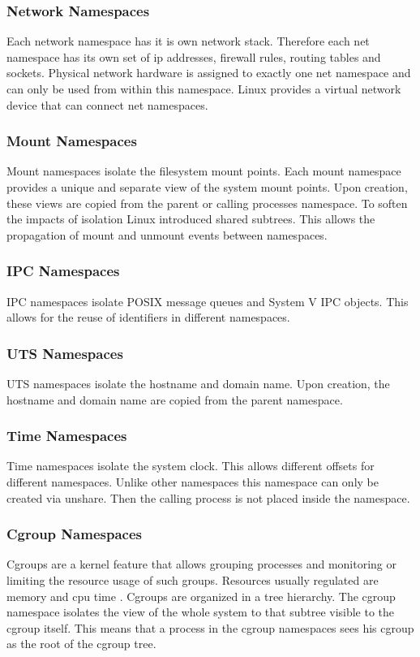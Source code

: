 \documentclass[10pt,twocolumn,a4paper]{article}
\begin{document}
\subsubsection{Network Namespaces}
Each network namespace has it is own network stack. Therefore each net namespace has its own set of ip
addresses, firewall rules, routing tables and sockets. Physical network hardware is assigned to exactly one
net namespace and can only be used from within this namespace. Linux provides a virtual network
 device that can connect net namespaces.\cite{10}

\subsubsection{Mount Namespaces}
Mount namespaces isolate the filesystem mount points. 
Each mount namespace provides a unique and separate view of the system mount points. 
Upon creation, these views are copied from the parent or calling processes namespace.
To soften the impacts of isolation Linux introduced shared subtrees. This allows the propagation of
mount and unmount events between namespaces.\cite{12}

\subsubsection{IPC Namespaces}
IPC namespaces isolate POSIX message queues and System V IPC objects. This allows for the reuse of identifiers
in different namespaces.\cite{13}

\subsubsection{UTS Namespaces}
UTS namespaces isolate the hostname and domain name. Upon creation, the hostname and domain name are copied from the parent namespace.\cite{14}

\subsubsection{Time Namespaces}
Time namespaces isolate the system clock. This allows different offsets for different namespaces.
Unlike other namespaces this namespace can only be created via unshare. 
Then the calling process is not placed inside the namespace.\cite{15}

\subsubsection{Cgroup Namespaces}
Cgroups are a kernel feature that allows grouping processes and monitoring or limiting the resource usage
of such groups.
Resources usually regulated are memory and cpu time \cite{16}.
Cgroups are organized in a tree hierarchy. 
The cgroup namespace isolates the view of the whole system to that subtree visible to the cgroup itself. 
This means that a process in the cgroup namespaces sees his cgroup as the root of the cgroup tree. \cite{17}
\end{document}
